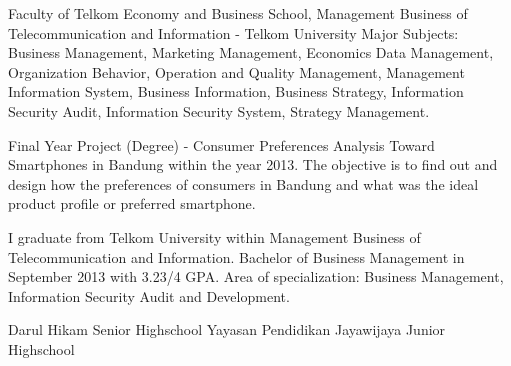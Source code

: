 

\begin{scholarship}
					{Faculty of Telkom Economy and Business School, Management Business of Telecommunication and Information - Telkom University
					Major Subjects: Business Management, Marketing Management, Economics
		Data Management,  Organization Behavior, Operation and Quality Management,	
		Management Information System, Business Information, Business Strategy,
		Information Security Audit, Information Security System, Strategy Management.

		Final Year Project (Degree) - Consumer Preferences Analysis Toward 					Smartphones in Bandung within the year 2013.
		The objective is to find out and design how the preferences of consumers in Bandung and what was the ideal product profile or 						preferred smartphone.

		I graduate from Telkom University within Management Business of 						Telecommunication and Information. Bachelor of Business Management 
		in September 2013 with 3.23/4 GPA. Area of specialization: Business 					Management, Information Security Audit and Development.
}
					{Darul Hikam Senior Highschool}
					{Yayasan Pendidikan Jayawijaya Junior Highschool}
\end{scholarship}
